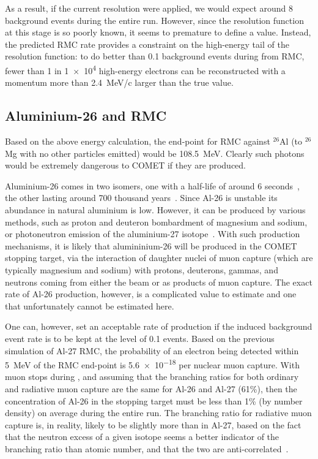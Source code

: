 As a result, if the current \phaseI resolution were applied, we would expect around 8 background events during the entire run.
However, since the resolution function at this stage is so poorly known, it seems to premature to define a value.
Instead, the predicted RMC rate provides a constraint on the high-energy tail of the resolution function: to do better than 0.1 background events during \phaseII from RMC, fewer than 1 in \num{1e4} high-energy electrons can be reconstructed with a momentum more than 2.4~MeV/c larger than the true value.

\subsection{Aluminium-26 and \ac{RMC}}
Based on the above energy calculation, the end-point for \ac{RMC} against ${}^{26}$Al (to ${}^{26}$Mg with no other particles emitted) would be 108.5~MeV.
Clearly such photons would be extremely dangerous to COMET if they are produced.

Aluminium-26 comes in two isomers, one with a half-life of around 6 seconds~\cite{PhysRevLett.106.032501}, the other lasting around 700 thousand years~\cite{AUDI20033}.
Since Al-26 is unstable its abundance in natural aluminium is low.
However, it can be produced by various methods, such as proton and deuteron bombardment of magnesium and sodium, or photoneutron emission of the aluminium-27 isotope~\cite{THOMPSON1965486}.
With such production mechanisms, it is likely that alumininium-26 will be produced in the COMET stopping target, via the interaction of daughter nuclei of muon capture (which are typically magnesium and sodium)
with protons, deuterons, gammas, and neutrons coming from either the beam or as products of muon capture.
The exact rate of Al-26 production, however, is a complicated value to estimate and one that unfortunately cannot be estimated here.

One can, however, set an acceptable rate of production if the induced background event rate is to be kept at the level of 0.1 events.
Based on the previous simulation of Al-27 \ac{RMC}, the probability of an electron being detected within 5~MeV of the \ac{RMC} end-point is \num{5.6e-18} per nuclear muon capture.
With \VarTotalMuStops muon stops during \phaseII, and assuming that the branching ratios for both ordinary and radiative muon capture are the same for Al-26 and Al-27 (61\%), then the
concentration of Al-26 in the stopping target must be less than 1\% (by number density) on average during the entire \phaseII run.
The branching ratio for radiative muon capture is, in reality, likely to be slightly more than in Al-27, based on the fact that the neutron excess of a given isotope seems a better indicator of the branching ratio than atomic number, and that the two are anti-correlated~\cite{RevModPhys.76.31}.

